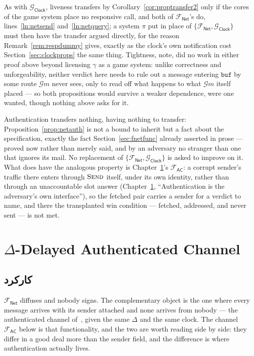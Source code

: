 \documentclass[10pt,oneside,openany]{book}
\makeatletter
\newcommand{\nav@headtext}{}
\newcommand{\nav@setheadtext}[1]{%
  \gdef\nav@headtext{%
    \ifnum\c@secnumdepth>\m@ne
      \if@mainmatter \@chapapp\ \lr{\thechapter.}\ \fi
    \fi #1}}
\newcommand{\chapterhead}[1]{\nav@setheadtext{#1}}
\newcommand{\op}[1]{\textnormal{\textsc{#1}}}
\newcommand{\Gm}{\mathcal{G}m}
\newcommand{\Gclock}{\mathcal{G}_{\mathsf{Clock}}}
\newcommand{\Fnet}{\mathcal{F}_{\mathsf{Net}}}
\newcommand{\Fac}{\mathcal{F}_{\mathsf{AC}}}
\newcommand{\V}[1]{\mathtt{#1}}
\theoremstyle{accentdef}
\theoremstyle{accentplain}
\makeatother
\begin{document}
As with $\Gclock$, liveness transfers by Corollary~\ref{cor:proptransfer2} only if the cores of the
game system place no responsive call, and both of $\Fnet$'s do, lines~\ref{ln:netsend}
and~\ref{ln:netquery}; a system $\pi$ put in place of $\{\Fnet,\Gclock\}$ must then have the
transfer argued directly, for the reason Remark~\ref{rem:respdummy} gives, exactly as the clock's
own notification cost Section~\ref{sec:clockprops} the same thing. Tightness, note, did no work
in either proof above beyond licensing $\gamma$ as a game system: unlike correctness and
unforgeability, neither verdict here needs to rule out a message entering $\V{buf}$ by some route
$\Gm$ never sees, only to read off what happens to what $\Gm$ itself placed --- so both
propositions would survive a weaker dependence, were one wanted, though nothing above asks for it.

Authentication transfers nothing, having nothing to transfer: Proposition~\ref{prop:netauth} is
not a bound to inherit but a fact about the specification, exactly the fact
Section~\ref{sec:fnetfunc} already asserted in prose --- proved now rather than merely said, and
by an adversary no stranger than one that ignores its mail. No replacement of $\{\Fnet,\Gclock\}$
is asked to improve on it. What does have the analogous property is Chapter~\ref{sec:fac}'s
$\Fac$: a corrupt sender's traffic there enters through $\op{Send}$ itself, under its own identity,
rather than through an unaccountable slot answer (Chapter~\ref{sec:fac}, ``Authentication is the
adversary's own interface''), so the fetched pair carries a sender for a verdict to name, and there
the transplanted win condition --- fetched, addressed, and never sent --- is not met.

\chapter{\texorpdfstring{$\Delta$}{Δ}-Delayed Authenticated Channel}\label{sec:fac}
\chapterhead{Delta-Delayed Authenticated Channel}

\section{کارکرد}\label{sec:facfunc}

$\Fnet$ diffuses and nobody signs. The complementary object is the one where every message
arrives with its sender attached and none arrives from nobody --- the authenticated channel
of~\cite{Canetti20}, given the same $\Delta$ and the same clock. The channel $\Fac$ below is that
functionality, and the two are worth reading side by side: they differ in a good deal more than
the sender field, and the difference is where authentication actually lives.
\end{document}
